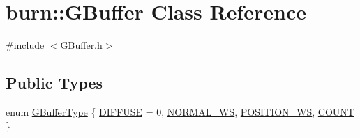 \hypertarget{classburn_1_1_g_buffer}{\section{burn\-:\-:G\-Buffer Class Reference}
\label{classburn_1_1_g_buffer}
}


{\ttfamily \#include $<$G\-Buffer.\-h$>$}

\subsection*{Public Types}
\begin{DoxyCompactItemize}
\item 
enum \hyperlink{classburn_1_1_g_buffer_a27671ebfd5462ecc1fdf0dd46ca8054e}{G\-Buffer\-Type} \{ \hyperlink{classburn_1_1_g_buffer_a27671ebfd5462ecc1fdf0dd46ca8054ea25a9ba8a25e525352304e17f724ad985}{D\-I\-F\-F\-U\-S\-E} = 0, 
\hyperlink{classburn_1_1_g_buffer_a27671ebfd5462ecc1fdf0dd46ca8054ea93a903818f09910e7712af28a3a050ff}{N\-O\-R\-M\-A\-L\-\_\-\-W\-S}, 
\hyperlink{classburn_1_1_g_buffer_a27671ebfd5462ecc1fdf0dd46ca8054ea1b48458614d5863b0fdd95aa1a81e1dc}{P\-O\-S\-I\-T\-I\-O\-N\-\_\-\-W\-S}, 
\hyperlink{classburn_1_1_g_buffer_a27671ebfd5462ecc1fdf0dd46ca8054ea4be9a72fb2d485ba841ef9354210ca9f}{C\-O\-U\-N\-T}
 \}
\end{DoxyCompactItemize}
